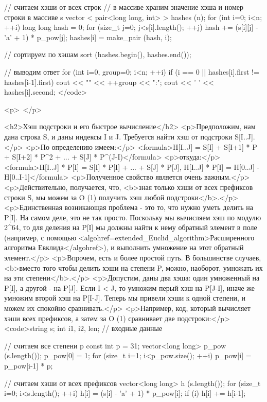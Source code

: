// считаем хэши от всех строк
// в массиве храним значение хэша и номер строки в массиве s
vector < pair<long long, int> > hashes (n);
for (int i=0; i<n; ++i)
{
	long long hash = 0;
	for (size_t j=0; j<s[i].length(); ++j)
		hash += (s[i][j] - 'a' + 1) * p_pow[j];
	hashes[i] = make_pair (hash, i);
}

// сортируем по хэшам
sort (hashes.begin(), hashes.end());

// выводим ответ
for (int i=0, group=0; i<n; ++i)
{
	if (i == 0 || hashes[i].first != hashes[i-1].first)
		cout << "\nGroup " << ++group << ":";
	cout << ' ' << hashes[i].second;
}</code>

<p> </p>

<h2>Хэш подстроки и его быстрое вычисление</h2>
<p>Предположим, нам дана строка S, и даны индексы I и J. Требуется найти хэш от подстроки S[I..J].</p>
<p>По определению имеем:</p>
<formula>H[I..J]  =  S[I]  +  S[I+1] * P  +  S[I+2] * P^2  +  ...  + S[J] * P^(J-I)</formula>
<p>откуда:</p>
<formula>H[I..J] * P[I]  =  S[I] * P[I]  +  ...  +  S[J] * P[J],
H[I..J] * P[I]  =  H[0..J]  -  H[0..I-1]</formula>
<p>Полученное свойство является очень важным.</p>
<p>Действительно, получается, что, <b>зная только хэши от всех префиксов строки S, мы можем за O (1) получить хэш любой подстроки</b>.</p>
<p>Единственная возникающая проблема - это то, что нужно уметь делить на P[I]. На самом деле, это не так просто. Поскольку мы вычисляем хэш по модулю 2^64, то для деления на P[I] мы должны найти к нему обратный элемент в поле (например, с помощью <algohref=extended_Euclid_algorithm>Расширенного алгоритма Евклида</algohref>), и выполнить умножение на этот обратный элемент.</p>
<p>Впрочем, есть и более простой путь. В большинстве случаев, <b>вместо того чтобы делить хэши на степени P, можно, наоборот, умножать их на эти степени</b>.</p>
<p>Допустим, даны два хэша: один умноженный на P[I], а другой - на P[J]. Если I < J, то умножим перый хэш на P[J-I], иначе же умножим второй хэш на P[I-J]. Теперь мы привели хэши к одной степени, и можем их спокойно сравнивать.</p>
<p>Например, код, который вычисляет хэши всех префиксов, а затем за O (1) сравнивает две подстроки:</p>
<code>string s;  int i1, i2, len; // входные данные

// считаем все степени p
const int p = 31;
vector<long long> p_pow (s.length());
p_pow[0] = 1;
for (size_t i=1; i<p_pow.size(); ++i)
	p_pow[i] = p_pow[i-1] * p;

// считаем хэши от всех префиксов
vector<long long> h (s.length());
for (size_t i=0; i<s.length(); ++i)
{
	h[i] = (s[i] - 'a' + 1) * p_pow[i];
	if (i)  h[i] += h[i-1];
}

